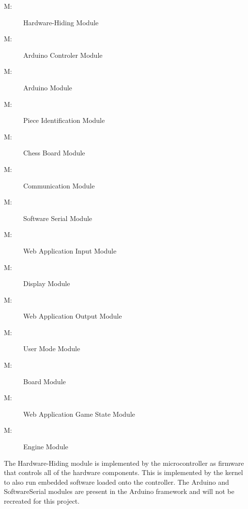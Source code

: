 \documentclass[12pt, titlepage]{article}
\newcounter{mnum}
\newcommand{\mthemnum}{M\themnum}
\begin{document}
\begin{description}
\item [ \mthemnum \label{mHH}:] Hardware-Hiding Module
\item [ \mthemnum \label{mAC}:] Arduino Controler Module
\item [ \mthemnum \label{mAM}:] Arduino Module
\item [ \mthemnum \label{mPI}:] Piece Identification Module
\item [ \mthemnum \label{mCB}:] Chess Board Module
\item [ \mthemnum \label{mCM}:] Communication Module
\item [ \mthemnum \label{mSS}:] Software Serial Module
\item [ \mthemnum \label{mInput}:] Web Application Input Module
\item [ \mthemnum \label{mDisplay}:] Display Module
\item [ \mthemnum \label{mOutput}:] Web Application Output Module
\item [ \mthemnum \label{mMode}:] User Mode Module
\item [ \mthemnum \label{mBoard}:] Board Module
\item [ \mthemnum \label{mGame}:] Web Application Game State Module
\item [ \mthemnum \label{mEngine}:] Engine Module
\end{description}

The Hardware-Hiding module is implemented by the microcontroller as firmware that controls all of the hardware components. This is implemented by the kernel to also run embedded software loaded onto the controller. The Arduino and SoftwareSerial modules are present in the Arduino framework and will not be recreated for this project.
\end{document}
